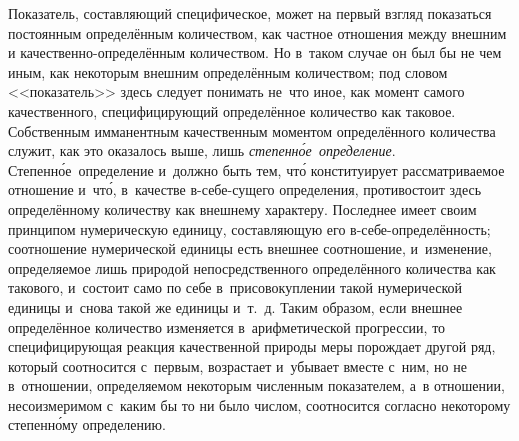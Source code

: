 Показатель, составляющий специфическое, может на первый взгляд показаться
постоянным определённым количеством, как частное отношения между внешним и
качественно-определённым количеством. Но в~таком случае он был бы не чем иным,
как некоторым внешним определённым количеством; под словом <<показатель>> здесь
следует понимать не~что иное, как момент самого качественного, специфицирующий
определённое количество как таковое. Собственным имманентным качественным
моментом определённого количества служит, как это оказалось выше, лишь
{\em степенн\'{о}е~определение}. Степенн\'{о}е~определение и~должно быть тем,
чт\'{о} конституирует рассматриваемое отношение и~чт\'{о}, в~качестве
в-себе-сущего определения, противостоит здесь определённому количеству как
внешнему характеру. Последнее имеет своим принципом нумерическую единицу,
составляющую его в-себе-определённость; соотношение нумерической единицы есть
внешнее соотношение, и~изменение, определяемое лишь природой непосредственного
определённого количества как такового, и~состоит само по себе в~присовокуплении
такой нумерической единицы и~снова такой же единицы и~т.~д. Таким образом, если
внешнее определённое количество изменяется в~арифметической прогрессии, то
специфицирующая реакция качественной природы меры порождает другой ряд, который
соотносится с~первым, возрастает и~убывает вместе с~ним, но не в~отношении,
определяемом некоторым численным показателем, а~в отношении, несоизмеримом
с~каким бы то ни было числом, соотносится согласно некоторому степенн\'{о}му
определению.

\subsubremark{}

